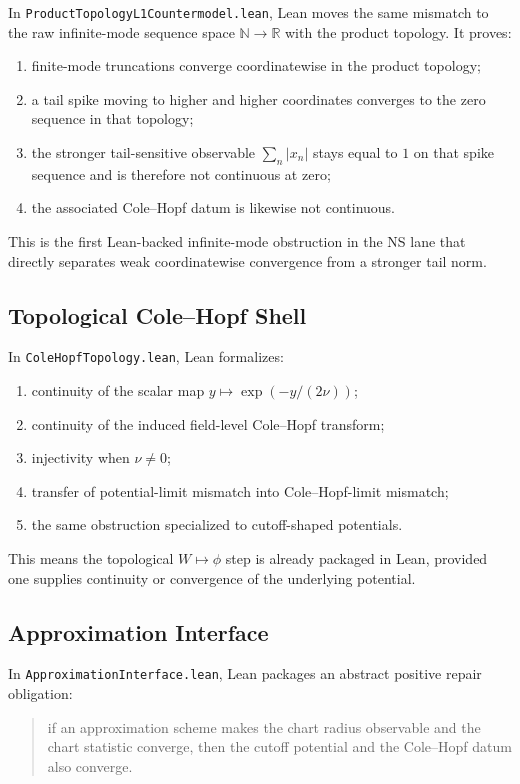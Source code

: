 \documentclass[11pt]{article}
\begin{document}
In \texttt{ProductTopologyL1Countermodel.lean}, Lean moves the same mismatch to
the raw infinite-mode sequence space \(\mathbb{N}\to\mathbb{R}\) with the
product topology.  It proves:
\begin{enumerate}[leftmargin=1.5em]
  \item finite-mode truncations converge coordinatewise in the product
  topology;
  \item a tail spike moving to higher and higher coordinates converges to the
  zero sequence in that topology;
  \item the stronger tail-sensitive observable
  \(\sum_n |x_n|\) stays equal to \(1\) on that spike sequence and is therefore
  not continuous at zero;
  \item the associated Cole--Hopf datum is likewise not continuous.
\end{enumerate}

This is the first Lean-backed infinite-mode obstruction in the NS lane that
directly separates weak coordinatewise convergence from a stronger tail norm.

\subsection{Topological Cole--Hopf Shell}

In \texttt{ColeHopfTopology.lean}, Lean formalizes:
\begin{enumerate}[leftmargin=1.5em]
  \item continuity of the scalar map \(y \mapsto \exp(-y/(2\nu))\);
  \item continuity of the induced field-level Cole--Hopf transform;
  \item injectivity when \(\nu \neq 0\);
  \item transfer of potential-limit mismatch into Cole--Hopf-limit mismatch;
  \item the same obstruction specialized to cutoff-shaped potentials.
\end{enumerate}

This means the topological \(W \mapsto \phi\) step is already packaged in Lean,
provided one supplies continuity or convergence of the underlying potential.

\subsection{Approximation Interface}

In \texttt{ApproximationInterface.lean}, Lean packages an abstract positive
repair obligation:
\begin{quote}
if an approximation scheme makes the chart radius observable and the chart
statistic converge, then the cutoff potential and the Cole--Hopf datum also
converge.
\end{quote}
\end{document}
